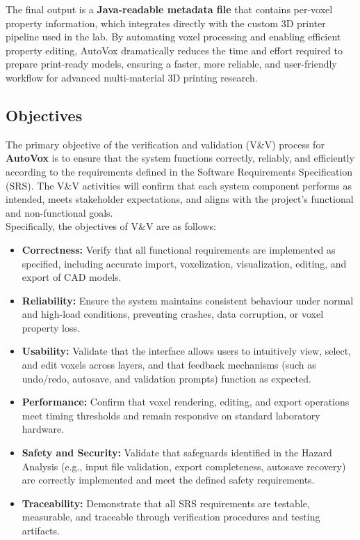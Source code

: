 \documentclass[12pt, titlepage]{article}
\begin{document}
\noindent The final output is a \textbf{Java-readable metadata file} that contains per-voxel property information, which integrates directly with the custom 3D printer pipeline used in the lab. By automating voxel processing and enabling efficient property editing, AutoVox dramatically reduces the time and effort required to prepare print-ready models, ensuring a faster, more reliable, and user-friendly workflow for advanced multi-material 3D printing research.\\

\subsection{Objectives}

The primary objective of the verification and validation (V\&V) process for \textbf{AutoVox} is to ensure that the system functions correctly, reliably, and efficiently according to the requirements defined in the Software Requirements Specification (SRS). The V\&V activities will confirm that each system component performs as intended, meets stakeholder expectations, and aligns with the project’s functional and non-functional goals.\\

\noindent Specifically, the objectives of V\&V are as follows:\\

\begin{itemize}
  \item \textbf{Correctness:} Verify that all functional requirements are implemented as specified, including accurate import, voxelization, visualization, editing, and export of CAD models.
  \item \textbf{Reliability:} Ensure the system maintains consistent behaviour under normal and high-load conditions, preventing crashes, data corruption, or voxel property loss.
  \item \textbf{Usability:} Validate that the interface allows users to intuitively view, select, and edit voxels across layers, and that feedback mechanisms (such as undo/redo, autosave, and validation prompts) function as expected.
  \item \textbf{Performance:} Confirm that voxel rendering, editing, and export operations meet timing thresholds and remain responsive on standard laboratory hardware.
  \item \textbf{Safety and Security:} Validate that safeguards identified in the Hazard Analysis (e.g., input file validation, export completeness, autosave recovery) are correctly implemented and meet the defined safety requirements.
  \item \textbf{Traceability:} Demonstrate that all SRS requirements are testable, measurable, and traceable through verification procedures and testing artifacts.
\end{itemize}
\end{document}
